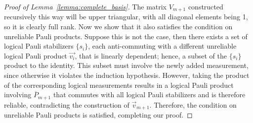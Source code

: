 \documentclass[prx,twocolumn,secnumarabic,balancelastpage,amsmath,amssymb,longbibliography]{revtex4-2}
\newcommand{\lop}[1]{\overline{#1}}
\newcommand{\nmeas}{m}
\begin{document}
\begin{proof}[Proof of Lemma~\ref{lemma:complete_basis}]
The matrix $V_{\nmeas+1}$ constructed recursively this way will be upper triangular, with all diagonal elements being 1, so it is clearly full rank.
%
Now we show that it also satisfies the condition on unreliable Pauli products.
%
Suppose this is not the case, then there exists a set of logical Pauli stabilizers $\{s_i\}$, each anti-commuting with a different unreliable logical Pauli product $\vec{v_i}$, that is linearly dependent; hence, a subset of the $\{s_i\}$ product to the identity.
%
This subset must involve the newly added measurement, since otherwise it violates the induction hypothesis.
%
However, taking the product of the corresponding logical measurements results in a logical Pauli product involving $\lop P_{\nmeas+1}$ that commutes with all logical Pauli stabilizers and is therefore reliable, contradicting the construction of $\vec{v}_{\nmeas+1}$.
%
Therefore, the condition on unreliable Pauli products is satisfied, completing our proof.
\end{proof}
\end{document}
